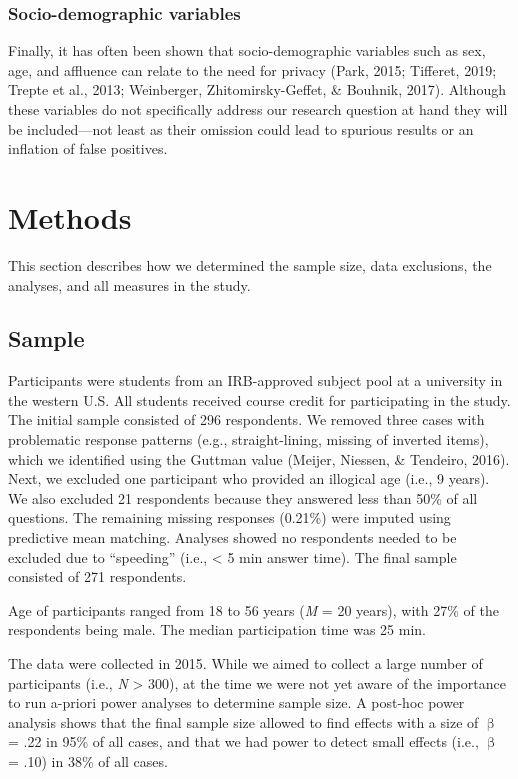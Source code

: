 \documentclass[man,floatsintext]{apa6}
\begin{document}
\hypertarget{socio-demographic-variables}{%
\subsubsection{Socio-demographic variables}\label{socio-demographic-variables}}

Finally, it has often been shown that socio-demographic variables such as sex, age, and affluence can relate to the need for privacy (Park, 2015; Tifferet, 2019; Trepte et al., 2013; Weinberger, Zhitomirsky-Geffet, \& Bouhnik, 2017). Although these variables do not specifically address our research question at hand they will be included---not least as their omission could lead to spurious results or an inflation of false positives.

\hypertarget{methods}{%
\section{Methods}\label{methods}}

This section describes how we determined the sample size, data exclusions, the analyses, and all measures in the study.

\hypertarget{sample}{%
\subsection{Sample}\label{sample}}

Participants were students from an IRB-approved subject pool at a university in the western U.S. All students received course credit for participating in the study. The initial sample consisted of 296 respondents. We removed three cases with problematic response patterns (e.g., straight-lining, missing of inverted items), which we identified using the Guttman value (Meijer, Niessen, \& Tendeiro, 2016). Next, we excluded one participant who provided an illogical age (i.e., 9 years). We also excluded 21 respondents because they answered less than 50\% of all questions. The remaining missing responses (0.21\%) were imputed using predictive mean matching. Analyses showed no respondents needed to be excluded due to \enquote{speeding} (i.e., \textless{} 5 min answer time). The final sample consisted of 271 respondents.

Age of participants ranged from 18 to 56 years (\emph{M} = 20 years), with 27\% of the respondents being male. The median participation time was 25 min.

The data were collected in 2015. While we aimed to collect a large number of participants (i.e., \emph{N} \textgreater{} 300), at the time we were not yet aware of the importance to run a-priori power analyses to determine sample size. A post-hoc power analysis shows that the final sample size allowed to find effects with a size of \(\upbeta\) = .22 in 95\% of all cases, and that we had power to detect small effects (i.e., \(\upbeta\) = .10) in 38\% of all cases.
\end{document}
